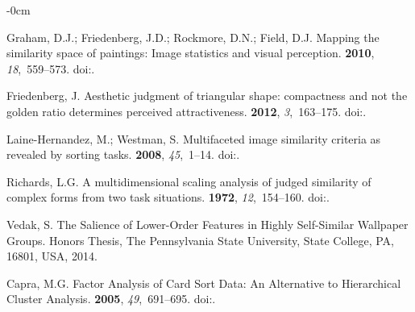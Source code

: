 \documentclass[symmetry,article,accept,pdftex,moreauthors]{Definitions/mdpi}
\begin{document}
\begin{adjustwidth}{-\extralength}{0cm}
\begin{thebibliography}{999}
Graham, D.J.; Friedenberg, J.D.; Rockmore, D.N.; Field, D.J.
\newblock Mapping the similarity space of paintings: Image statistics and
  visual perception.
 {\bf 2010}, {\em 18},~559--573.
\newblock
  doi:{\href{https://doi.org/10.1080/13506280902934454}{}}.

Friedenberg, J.
\newblock Aesthetic judgment of triangular shape: compactness and not the
  golden ratio determines perceived attractiveness.
 {\bf 2012}, {\em 3},~163--175.
\newblock
  doi:{\href{https://doi.org/10.1068/i0484}{}}.

Laine-Hernandez, M.; Westman, S.
\newblock Multifaceted image similarity criteria as revealed by sorting tasks.
 {\bf 2008}, {\em 45},~1--14.
\newblock
  doi:{\href{https://doi.org/10.1002/meet.2008.1450450256}{}}.

Richards, L.G.
\newblock A multidimensional scaling analysis of judged similarity of complex
  forms from two task situations.
 {\bf 1972}, {\em 12},~154--160.
\newblock
  doi:{\href{https://doi.org/10.3758/BF03212862}{}}.

Vedak, S.
\newblock The Salience of Lower-Order Features in Highly Self-Similar Wallpaper
  Groups.
\newblock  Honors Thesis, The Pennsylvania State University, State College, PA, 16801, USA, 2014.

Capra, M.G.
\newblock Factor {Analysis} of {Card} {Sort} {Data}: {An} {Alternative} to
  {Hierarchical} {Cluster} {Analysis}.
 {\bf 2005}, {\em 49},~691--695.
  doi:{\href{https://doi.org/10.1177/154193120504900512}{}}.

\end{thebibliography}



\end{adjustwidth}
\end{document}

